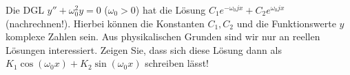 \item Die DGL $y''+\omega_0^2y=0$ ($\omega_0>0$) hat die Lösung $C_1e^{-\omega_0 j x} + C_2e^{\omega_0 j x}$ (nachrechnen!). Hierbei können die Konstanten $C_1, C_2$ und die Funktionswerte $y$ komplexe Zahlen sein. Aus physikalischen Grunden sind wir nur an reellen Lösungen interessiert. Zeigen Sie, dass sich diese Lösung dann als $K_1 \cos(\omega_0 x) + K_2 \sin(\omega_0 x)$ schreiben lässt!